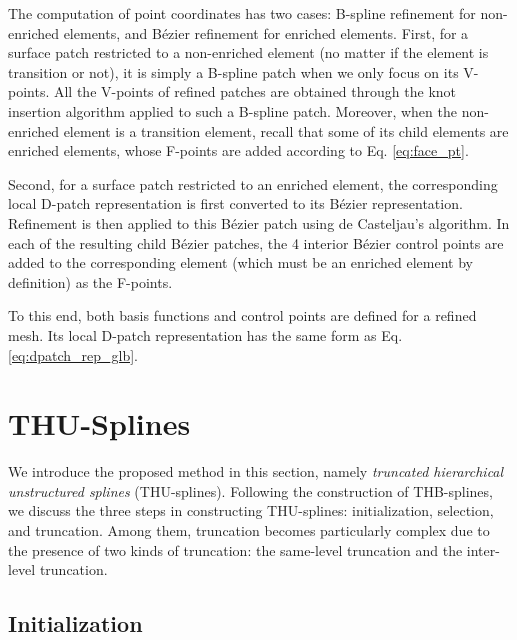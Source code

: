 \documentclass[graybox]{svmult}
\begin{document}
The computation of point coordinates has two cases: B-spline refinement for non-enriched elements, and B\'{e}zier refinement for enriched elements. First, for a surface patch restricted to a non-enriched element (no matter if the element is transition or not), it is simply a B-spline patch when we only focus on its V-points. All the V-points of refined patches are obtained through the knot insertion algorithm applied to such a B-spline patch. Moreover, when the non-enriched element is a transition element, recall that some of its child elements are enriched elements, whose F-points are added according to Eq. \eqref{eq:face_pt}.

Second, for a surface patch restricted to an enriched element, the corresponding local D-patch representation is first converted to its B\'{e}zier representation. Refinement is then applied to this B\'{e}zier patch using de Casteljau's algorithm. In each of the resulting child B\'{e}zier patches, the 4 interior B\'{e}zier control points are added to the corresponding element (which must be an enriched element by definition) as the F-points.

To this end, both basis functions and control points are defined for a refined mesh. Its local D-patch representation has the same form as Eq. \eqref{eq:dpatch_rep_glb}.

\section{THU-Splines}
\label{sec:thu}

We introduce the proposed method in this section, namely \emph{truncated hierarchical unstructured splines} (THU-splines). Following the construction of THB-splines, we discuss the three steps in constructing THU-splines: initialization, selection, and truncation. Among them, truncation becomes particularly complex due to the presence of two kinds of truncation: the same-level truncation and the inter-level truncation. 

\subsection{Initialization}
\end{document}
